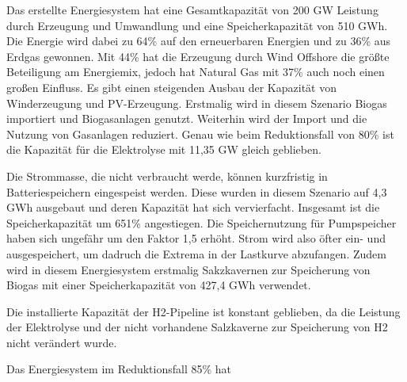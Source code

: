 Das erstellte Energiesystem hat eine Gesamtkapazität von 200 GW Leistung durch Erzeugung und Umwandlung und eine Speicherkapazität von 510 GWh. Die Energie wird dabei zu 64\% auf den erneuerbaren Energien und zu 36\% aus Erdgas gewonnen. Mit 44\% hat die Erzeugung durch Wind Offshore die größte Beteiligung am Energiemix, jedoch hat Natural Gas mit 37\% auch noch einen großen Einfluss.
\newline
Es gibt einen steigenden Ausbau der Kapazität von Winderzeugung und PV-Erzeugung. Erstmalig wird in diesem Szenario Biogas importiert und Biogasanlagen genutzt. Weiterhin wird der Import und die Nutzung von Gasanlagen reduziert.
\newline
Genau wie beim Reduktionsfall von 80\% ist die Kapazität für die Elektrolyse mit 11,35 GW gleich geblieben.



Die Strommasse, die nicht verbraucht werde, können kurzfristig in Batteriespeichern eingespeist werden. Diese wurden in diesem Szenario auf 4,3 GWh ausgebaut und deren Kapazität hat sich vervierfacht.
\newline
Insgesamt ist die Speicherkapazität um 651\% angestiegen. Die Speichernutzung für Pumpspeicher haben sich ungefähr um den Faktor 1,5 erhöht. Strom wird also öfter ein- und ausgespeichert, um dadruch die Extrema in der Lastkurve abzufangen. Zudem wird in diesem Energiesystem erstmalig Sakzkavernen zur Speicherung von Biogas mit einer Speicherkapazität von 427,4 GWh verwendet.


Die installierte Kapazität der H2-Pipeline ist konstant geblieben, da die Leistung der Elektrolyse und der nicht vorhandene Salzkaverne zur Speicherung von H2 nicht verändert wurde.

Das Energiesystem im Reduktionsfall 85\% hat 

